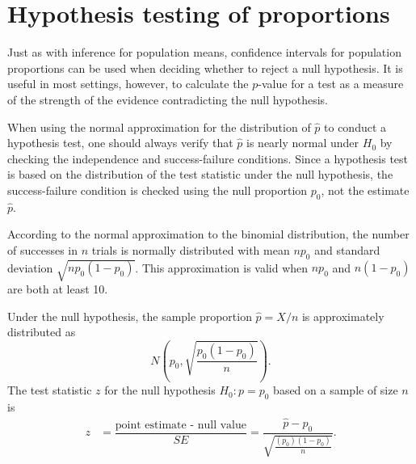       

\section{Hypothesis testing of proportions}
\label{HTofProportion}


Just as with inference for population means, confidence intervals for population proportions can be used when deciding whether to reject a null hypothesis. It is useful in most settings, however, to calculate the $p$-value for a test as a measure of the strength of the evidence contradicting the null hypothesis.

When using the normal approximation for the distribution of $\hat{p}$ to conduct a hypothesis test, one should always verify that $\hat{p}$ is nearly normal under $H_0$ by checking the independence and success-failure conditions. Since a hypothesis test is based on the distribution of the test statistic under the null hypothesis, the success-failure condition is checked using the null proportion $p_0$, not the estimate $\hat{p}$. 

According to the normal approximation to the binomial distribution, the number of successes in $n$ trials is normally distributed with mean $np_0$ and standard deviation $\sqrt{np_0(1-p_0)}$. This approximation is valid when $np_0$ and $n(1-p_0)$ are both at least 10.%


Under the null hypothesis, the sample proportion $\hat{p} = X/n$ is approximately distributed as 
\[N \left(p_0, \sqrt{\frac{p_0(1-p_0)}{n}} \right).\]
The test statistic $z$ for the null hypothesis $H_0: p = p_0$ based on a sample of size $n$ is 
\begin{align*}
  z &= \dfrac{\text{point estimate - null value}}{SE} =\dfrac{\hat{p} - p_0}{\sqrt{\frac{(p_0)(1-p_0)}{n}}}. 
\end{align*}


